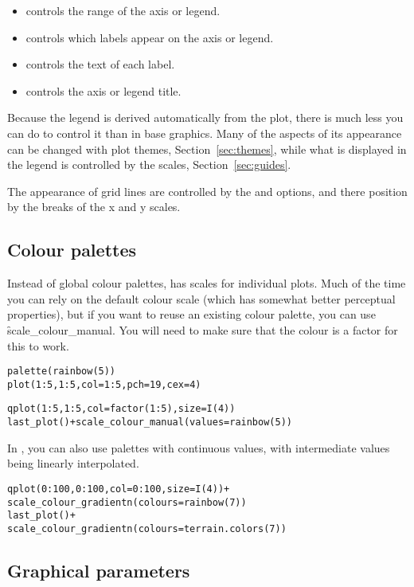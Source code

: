 \begin{itemize}
  \item {} controls the range of the axis or legend.
  \item {} controls which labels appear on the axis or legend.
  \item {} controls the text of each label.
  \item {} controls the axis or legend title.
\end{itemize}

Because the legend is derived automatically from the plot, there is much less you can do to control it than in base graphics.  Many of the aspects of its appearance can be changed with plot themes, Section~\ref{sec:themes}, while what is displayed in the legend is controlled by the scales, Section~\ref{sec:guides}.

The appearance of grid lines are controlled by the  and  options, and there position by the breaks of the x and y scales.

\subsection{Colour palettes}

Instead of global colour palettes, \ggplot has scales for individual plots.  Much of the time you can rely on the default colour scale (which has somewhat better perceptual properties), but if you want to reuse an existing colour palette, you can use \f{scale_colour_manual}.  You will need to make sure that the colour is a factor for this to work.

\begin{alltt}
palette(rainbow(5))
plot(1:5, 1:5, col = 1:5, pch = 19, cex = 4)

qplot(1:5, 1:5, col = factor(1:5), size = I(4))
last_plot() + scale_colour_manual(values = rainbow(5))
\end{alltt}

In \ggplot, you can also use palettes with continuous values, with intermediate values being linearly interpolated.

\begin{alltt}
qplot(0:100, 0:100, col = 0:100, size = I(4)) +
  scale_colour_gradientn(colours = rainbow(7))
last_plot() +
  scale_colour_gradientn(colours = terrain.colors(7))
\end{alltt}

\subsection{Graphical parameters}

